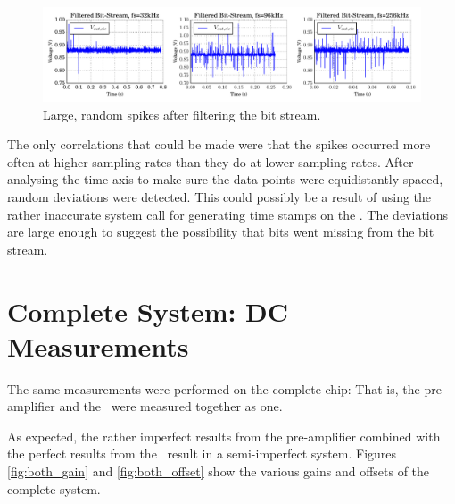\begin{figure}
    \centering
    \includegraphics[width=0.95\linewidth]{images/plots/noisy_bitstream.pdf}
    \caption{Large, random spikes after filtering the bit stream.}
    \label{fig:noisy_sigdel}
\end{figure}

The only  correlations that could be  made were that the  spikes occurred more
often at  higher sampling rates  than they  do at lower  sampling rates. After
analysing  the time  axis  to make  sure the  data  points were  equidistantly
spaced, random deviations  were detected.  This could possibly be  a result of
using the  rather inaccurate system call   for generating
time stamps on the \raspi. \newpage The deviations are large enough to suggest
the possibility that bits went missing from the bit stream.

\section{Complete System: DC Measurements}
\label{sec:systemDC}

The  same  measurements  were  performed  on  the complete chip: That is,  the
pre-amplifier and the \sdm~were measured together as one.

As expected, the rather imperfect results from the pre-amplifier combined with
the perfect results from the \sdm~result in a  semi-imperfect  system. Figures
\ref{fig:both_gain}  and  \ref{fig:both_offset}  show  the  various gains  and
offsets of the complete system.

